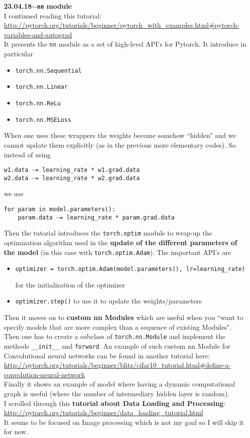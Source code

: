 \documentclass[11pt,a4paper]{article}
\newenvironment{loggentry}[2]%
{\noindent\textbf{#1}\hspace{1cm}$\mathbf{\sim}$\text{ }\textbf{#2}\\}{\vspace{0.5cm}}
\begin{document}
\begin{loggentry}{23.04.18}{\texttt{nn} module}
I continued reading this tutorial:\\
\url{http://pytorch.org/tutorials/beginner/pytorch_with_examples.html#pytorch-variables-and-autograd}\\
It presents the \texttt{nn} module as a set of high-level API's for Pytorch. It introduce in particular
\begin{itemize}
\item \texttt{torch.nn.Sequential}
\item \texttt{torch.nn.Linear}
\item \texttt{torch.nn.ReLu}
\item \texttt{torch.nn.MSELoss}
\end{itemize}
When one uses these wrappers the weights become somehow ``hidden" and we cannot update them explicitly (as in the previous more elementary codes). So instead of using
\begin{verbatim}
w1.data -= learning_rate * w1.grad.data
w2.data -= learning_rate * w2.grad.data
\end{verbatim}
we use
\begin{verbatim}
for param in model.parameters():
    param.data -= learning_rate * param.grad.data
\end{verbatim}
Then the tutorial introduces the \texttt{torch.optim} module to wrap-up the optimization algorithm used in the \textbf{update of the different parameters of the model} (in this case with \texttt{torch.optim.Adam}). The important API's are
\begin{itemize}
\item \begin{verbatim}
optimizer = torch.optim.Adam(model.parameters(), lr=learning_rate)
\end{verbatim}
for the initialization of the optimizer
\item \texttt{optimizer.step()} to use it to update the weights/parameters
\end{itemize}
Then it moves on to \textbf{custom nn Modules} which are useful when you ``want to specify models that are more complex than a sequence of existing Modules". Then one has to create a subclass of \texttt{torch.nn.Module} and implement the methods \texttt{\_\_init\_\_} and \texttt{forward}. An example of such custom nn Module for Convolutional neural networks can be found in another tutorial here:\\
\url{http://pytorch.org/tutorials/beginner/blitz/cifar10_tutorial.html#define-a-convolution-neural-network}\\
Finally it shows an example of model where having a dynamic computational graph is useful (where the number of intermediary hidden layer is random).\\

I scrolled through this \textbf{tutorial about Data Loading and Processing}:
\url{http://pytorch.org/tutorials/beginner/data_loading_tutorial.html}\\
It seems to be focused on Image processing which is not my goal so I will skip it for now.
\end{loggentry}
\end{document}
